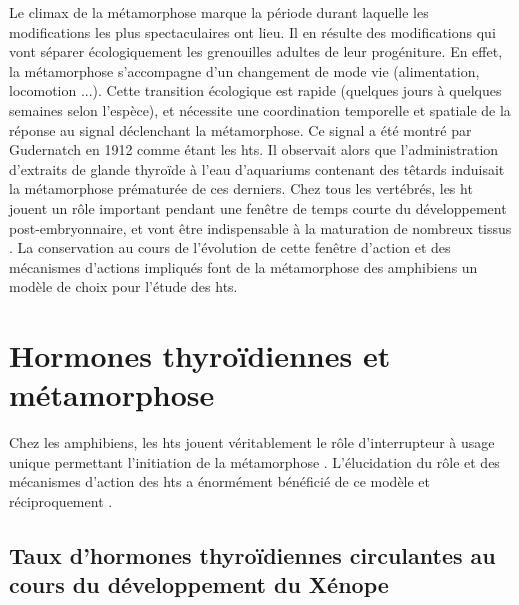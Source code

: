 \documentclass[../main.tex]{subfiles}
\begin{document}
Le climax de la métamorphose marque la période durant laquelle les modifications les plus spectaculaires ont lieu.
Il en résulte des modifications qui vont séparer écologiquement les grenouilles adultes de leur progéniture.
En effet, la métamorphose s'accompagne d'un changement de mode vie (alimentation, locomotion ...).
Cette transition écologique est rapide (quelques jours à quelques semaines selon l'espèce), et nécessite une coordination temporelle et spatiale de la réponse au signal déclenchant la métamorphose.
Ce signal a été montré par Gudernatch en 1912 comme étant les \glspl{ht}.
Il observait alors que l'administration d'extraits de glande thyroïde à l'eau d'aquariums contenant des têtards induisait la métamorphose prématurée de ces derniers.
Chez tous les vertébrés, les \gls{ht} jouent un rôle important pendant une fenêtre de temps courte du développement post-embryonnaire, et vont être indispensable à la maturation de nombreux tissus \citep{Laudet2011b}.
La conservation au cours de l'évolution de cette fenêtre d'action et des mécanismes d'actions impliqués font de la métamorphose des amphibiens un modèle de choix pour l'étude des \glspl{ht}.



\section{Hormones thyroïdiennes et métamorphose}

Chez les amphibiens, les \glspl{ht} jouent véritablement le rôle d'interrupteur à usage unique permettant l'initiation de la métamorphose \citep{Shi1998}.
L'élucidation du rôle et des mécanismes d'action des \glspl{ht} a énormément bénéficié de ce modèle et réciproquement \citep{Wong1995,Wong1998a}.


\subsection{Taux d'hormones thyroïdiennes circulantes au cours du développement du Xénope}
\end{document}
